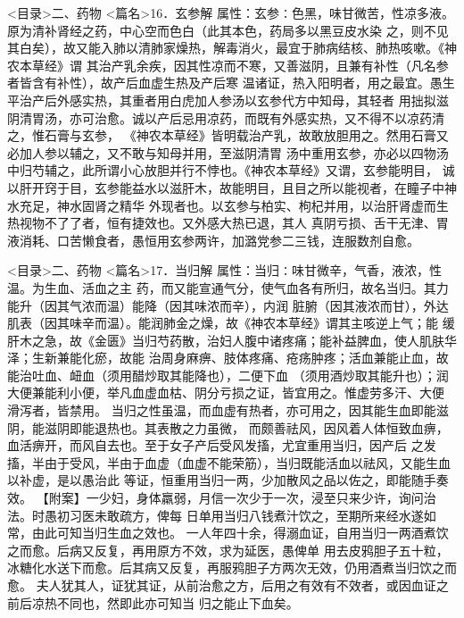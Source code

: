 \documentclass[a4paper,12pt,UTF8,twoside]{ctexbook}
\begin{document}
<目录>二、药物
<篇名>16．玄参解
属性：玄参∶色黑，味甘微苦，性凉多液。原为清补肾经之药，中心空而色白（此其本色，药局多以黑豆皮水染 
之，则不见其白矣），故又能入肺以清肺家燥热，解毒消火，最宜于肺病结核、肺热咳嗽。《神农本草经》谓 
其治产乳余疾，因其性凉而不寒，又善滋阴，且兼有补性（凡名参者皆含有补性），故产后血虚生热及产后寒 
温诸证，热入阳明者，用之最宜。愚生平治产后外感实热，其重者用白虎加人参汤以玄参代方中知母，其轻者 
用拙拟滋阴清胃汤，亦可治愈。诚以产后忌用凉药，而既有外感实热，又不得不以凉药清之，惟石膏与玄参， 
《神农本草经》皆明载治产乳，故敢放胆用之。然用石膏又必加人参以辅之，又不敢与知母并用，至滋阴清胃 
汤中重用玄参，亦必以四物汤中归芍辅之，此所谓小心放胆并行不悖也。《神农本草经》又谓，玄参能明目， 
诚以肝开窍于目，玄参能益水以滋肝木，故能明目，且目之所以能视者，在瞳子中神水充足，神水固肾之精华 
外现者也。以玄参与柏实、枸杞并用，以治肝肾虚而生热视物不了了者，恒有捷效也。又外感大热已退，其人 
真阴亏损、舌干无津、胃液消耗、口苦懒食者，愚恒用玄参两许，加潞党参二三钱，连服数剂自愈。 

<目录>二、药物
<篇名>17．当归解
属性：当归∶味甘微辛，气香，液浓，性温。为生血、活血之主 
药，而又能宣通气分，使气血各有所归，故名当归。其力能升（因其气浓而温）能降（因其味浓而辛），内润 
脏腑（因其液浓而甘），外达肌表（因其味辛而温）。能润肺金之燥，故《神农本草经》谓其主咳逆上气；能 
缓肝木之急，故《金匮》当归芍药散，治妇人腹中诸疼痛；能补益脾血，使人肌肤华泽；生新兼能化瘀，故能 
治周身麻痹、肢体疼痛、疮疡肿疼；活血兼能止血，故能治吐血、衄血（须用醋炒取其能降也），二便下血 
（须用酒炒取其能升也）；润大便兼能利小便，举凡血虚血枯、阴分亏损之证，皆宜用之。惟虚劳多汗、大便 
滑泻者，皆禁用。 
当归之性虽温，而血虚有热者，亦可用之，因其能生血即能滋阴，能滋阴即能退热也。其表散之力虽微， 
而颇善祛风，因风着人体恒致血痹，血活痹开，而风自去也。至于女子产后受风发搐，尤宜重用当归，因产后 
之发搐，半由于受风，半由于血虚（血虚不能荣筋），当归既能活血以祛风，又能生血以补虚，是以愚治此 
等证，恒重用当归一两，少加散风之品以佐之，即能随手奏效。 
【附案】一少妇，身体羸弱，月信一次少于一次，浸至只来少许，询问治法。时愚初习医未敢疏方，俾每 
日单用当归八钱煮汁饮之，至期所来经水遂如常，由此可知当归生血之效也。 
一人年四十余，得溺血证，自用当归一两酒煮饮之而愈。后病又反复，再用原方不效，求为延医，愚俾单 
用去皮鸦胆子五十粒，冰糖化水送下而愈。后其病又反复，再服鸦胆子方两次无效，仍用酒煮当归饮之而愈。 
夫人犹其人，证犹其证，从前治愈之方，后用之有效有不效者，或因血证之前后凉热不同也，然即此亦可知当 
归之能止下血矣。 
\end{document}
